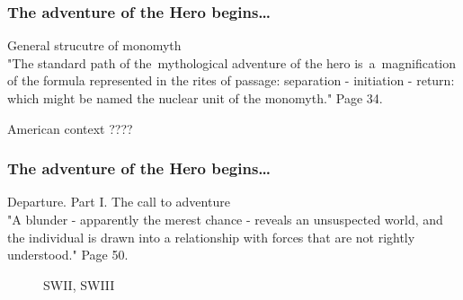 \documentclass[10pt,t]{beamer}
\begin{document}
\begin{frame}
  \frametitle{The adventure of the Hero begins\ldots}


  General strucutre of monomyth \\
  "The standard path of the~mythological adventure of the hero
  is~a~magnification of the formula represented in the rites of
  passage: separation - initiation - return: which might be named
  the nuclear unit of the monomyth." Page 34.

  American context ????


  \begin{figure}

    \centering


  \end{figure}

\end{frame}





\begin{frame}
  \frametitle{The adventure of the Hero begins\ldots}


  Departure. Part I. The call to adventure \\
  "A blunder - apparently the merest chance - reveals an unsuspected
  world, and the individual is drawn into a relationship with forces
  that are not rightly understood." Page 50.


  \begin{figure}

    \centering


    SWII, SWIII

  \end{figure}

\end{frame}
\end{document}
